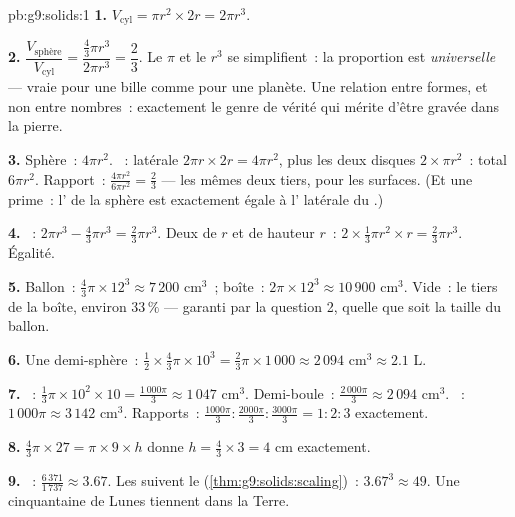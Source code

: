\begin{solution}{pb:g9:solids:1}
\textbf{1.} $V_{\text{cyl}} = \pi r^2 \times 2r = 2\pi r^3$.

\textbf{2.} $\dfrac{V_{\text{sphère}}}{V_{\text{cyl}}}
= \dfrac{\frac43 \pi r^3}{2 \pi r^3} = \dfrac23$. Le $\pi$ et le
$r^3$ se simplifient~: la proportion est \emph{universelle} ---
vraie pour une bille comme pour une planète. Une relation entre
formes, et non entre nombres~: exactement le genre de vérité qui
mérite d'être gravée dans la pierre.

\textbf{3.} Sphère~: $4\pi r^2$. ~: latérale
$2\pi r \times 2r = 4\pi r^2$, plus les deux disques
$2 \times \pi r^2$~: total $6\pi r^2$. Rapport~:
$\frac{4\pi r^2}{6\pi r^2} = \frac23$ --- les mêmes deux tiers,
pour les surfaces. (Et une prime~: l' de la sphère est
exactement égale à l' latérale du .)

\textbf{4.} ~: $2\pi r^3 - \frac43\pi r^3 = \frac23 \pi r^3$.
Deux  de  $r$ et de hauteur $r$~:
$2 \times \frac13 \pi r^2 \times r = \frac23 \pi r^3$. Égalité.

\textbf{5.} Ballon~: $\frac43 \pi \times 12^3 \approx 7\,200$
cm$^3$~; boîte~: $2\pi \times 12^3 \approx 10\,900$ cm$^3$. Vide~:
le tiers de la boîte, environ $33\,\%$ --- garanti par la question
2, quelle que soit la taille du ballon.

\textbf{6.} Une demi-sphère~:
$\frac12 \times \frac43 \pi \times 10^3 = \frac23 \pi \times
1\,000 \approx 2\,094$ cm$^3 \approx 2.1$ L.

\textbf{7.} ~: $\frac13 \pi \times 10^2 \times 10 =
\frac{1\,000\pi}{3} \approx 1\,047$ cm$^3$. Demi-boule~:
$\frac{2\,000\pi}{3} \approx 2\,094$ cm$^3$. ~:
$1\,000\pi \approx 3\,142$ cm$^3$. Rapports~:
$\frac{1000\pi}{3} : \frac{2000\pi}{3} : \frac{3000\pi}{3}
= 1 : 2 : 3$ exactement.

\textbf{8.} $\frac43 \pi \times 27 = \pi \times 9 \times h$ donne
$h = \frac43 \times 3 = 4$ cm exactement.

\textbf{9.} ~: $\frac{6\,371}{1\,737} \approx 3.67$. Les
 suivent le  (\cref{thm:g9:solids:scaling})~:
$3.67^3 \approx 49$. Une cinquantaine de Lunes tiennent dans la
Terre.


\end{solution}
